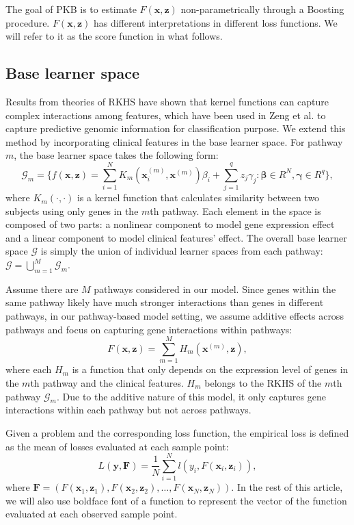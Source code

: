 \documentclass[a4paper,12pt]{article}
\newcommand{\bd}[1]{\mathbf{#1}}
\newcommand{\pathexpr}[3]{{#1}_{#2}^{(#3)}}
\begin{document}
	The goal of PKB is to estimate $F(\bd{x}, \bd{z})$ non-parametrically through a Boosting procedure. $F(\bd{x}, \bd{z})$ has different interpretations in different loss functions. We will refer to it as the score function in what follows.
	\subsection{Base learner space}
	Results from theories of RKHS\cite{friedman2001elements} have shown that kernel functions can capture complex interactions among features, which have been used in Zeng et al.\citep{zeng2019pathway} to capture predictive genomic information for classification purpose. We extend this method by incorporating clinical features in the base learner space. For pathway $m$, the base learner space takes the following form:
	\begin{equation}
	\label{eqn:G}
	\mathcal{G}_m = \{  f(\bd{x}, \bd{z}) = \sum_{i=1}^N K_m(\pathexpr{\bd{x}}{i}{m}, \pathexpr{\bd{x} }{}{m}) \beta_i + \sum_{j=1}^q z_j \gamma_j : \mathbf{\beta} \in R^{N}, \mathbf{\gamma} \in R^{q} \},
	\end{equation}
	where $K_m(\cdot,\cdot)$ is a kernel function that calculates similarity between two subjects using only genes in the $m$th pathway. Each element in the space is composed of two parts: a nonlinear component to model gene expression effect and a linear component to model clinical features' effect. The overall base learner space $\mathcal{G}$ is simply the union of individual learner spaces from each pathway: $\mathcal{G} = \bigcup_{m=1}^M\mathcal{G}_m$.
	
	Assume there are $M$ pathways considered in our model. Since genes within the same pathway likely have much stronger interactions than genes in different pathways, in our pathway-based model setting, we assume additive effects across pathways and focus on capturing gene interactions within pathways:
	\begin{equation*}
	F(\bd{x}, \bd{z}) = \sum_{m=1}^M H_m(\bd{x}^{(m)}, \bd{z}),
	\end{equation*}
	where each $H_m$ is a function that only depends on the expression level of genes in the $m$th pathway and the clinical features. $H_m$ belongs to the RKHS of the $m$th pathway $\mathcal{G}_m $. Due to the additive nature of this model, it only captures gene interactions within each pathway but not across pathways. 
	
	Given a problem and the corresponding loss function, the empirical loss is defined as the mean of losses evaluated at each sample point:
	$$L(\bd{y},\bd{F}) = \frac{1}{N} \sum_{i=1}^N l(y_i,F(\bd{x}_i,\bd{z}_i)),$$
	where $\bd{F} = (F(\bd{x}_1, \bd{z}_1), F(\bd{x}_2, \bd{z}_2), \ldots, F(\bd{x}_N, \bd{z}_N))$. In the rest of this article, we will also use boldface font of a function to represent the vector of the function evaluated at each observed sample point.
	
\end{document}
